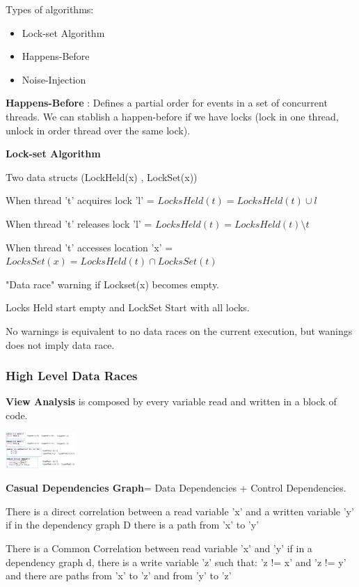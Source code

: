 Types of algorithms:

\begin{itemize}
    \item Lock-set Algorithm
    \item Happens-Before
    \item Noise-Injection
\end{itemize}

\textbf{Happens-Before} : Defines a partial order for events in a set of concurrent threads. We can stablish a happen-before if we have locks (lock in one thread, unlock in order thread over the same lock).

\textbf{Lock-set Algorithm}\par
Two data structs (LockHeld(x) , LockSet(x)) \par
When thread 't' acquires lock 'l' = $LocksHeld(t) = LocksHeld(t) \cup {l}$ \par
When thread 't' releases lock 'l' = $LocksHeld(t) = LocksHeld(t) \setminus {t}$\par
When thread 't' accesses location 'x' = $LocksSet(x) = LocksHeld(t) \cap LocksSet(t)$\par
"Data race" warning if Lockset(x) becomes empty. \par
Locks Held start empty and LockSet Start with all locks.\par
No warnings is equivalent to no data races on the current execution, but wanings does not imply data race.\par


\subsubsection{High Level Data Races}

\textbf{View Analysis} is composed by every variable read and written in a block of code.

\includegraphics[width=0.20\textwidth]{ConcurrencyErrors/view.png}

\textbf{Casual Dependencies Graph}= Data Dependencies + Control Dependencies.\par

There is a direct correlation between a read variable 'x' and a written variable 'y' if in the dependency graph D there is a path from 'x' to 'y'\par
There is a Common Correlation between read variable 'x' and 'y' if in a dependency graph d, there is a write variable 'z' such that: 'z != x' and 'z != y' and there are paths from 'x' to 'z' and from 'y' to 'z'


